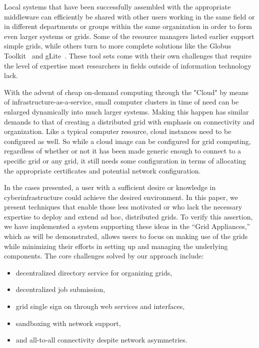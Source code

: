 \documentclass[conference]{IEEEtran}
\begin{document}
Local systems that have been successfully assembled with the appropriate
middleware can efficiently be shared with other users working in the same field
or in different departments or groups within the same organization in order to
form even larger systems or grids.  Some of the resource managers listed
earlier support simple grids, while others turn to more complete solutions like
the Globus Toolkit~\cite{globus} and gLite~\cite{glite}.  These tool sets come
with their own challenges that require the level of expertise most researchers
in fields outside of information technology lack.

With the advent of cheap on-demand computing through the "Cloud" by means of
infrastructure-as-a-service, small computer clusters in time of need can be
enlarged dynamically into much larger systems.  Making this happen has similar
demands to that of creating a distributed grid with emphasis on connectivity
and organization.  Like a typical computer resource, cloud instances need to be
configured as well.  So while a cloud image can be configured for grid
computing, regardless of whether or not it has been made generic enough to
connect to a specific grid or any grid, it still needs some configuration in
terms of allocating the appropriate certificates and potential network
configuration.

In the cases presented, a user with a sufficient desire or knowledge in
cyberinfrastructure could achieve the desired environment.  In this paper, we
present techniques that enable those less motivated or who lack the necessary
expertise to deploy and extend ad hoc, distributed grids.  To verify this
assertion, we have implemented a system supporting these ideas in the ``Grid
Appliances,'' which as will be demonstrated, allows users to focus on making
use of the grids while minimizing their efforts in setting up and managing the
underlying components.  The core challenges solved by our approach include:
\begin{itemize}
\item decentralized directory service for organizing grids,
\item decentralized job submission,
\item grid single sign on through web services and interfaces,
\item sandboxing with network support,
\item and all-to-all connectivity despite network asymmetries.
\end{itemize}
\end{document}

